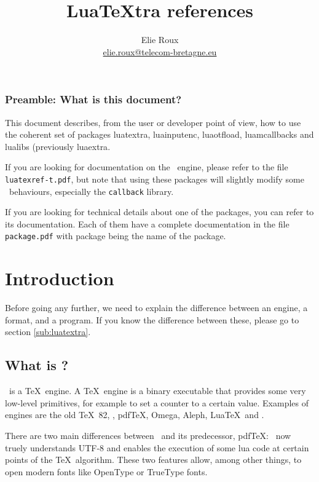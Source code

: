\documentclass{article}
\title{Lua\TeX tra references}
\author{Elie Roux \\ \url{elie.roux@telecom-bretagne.eu}}
\makeatletter
\newlength\xxt@kern@Te
\newlength\xxt@kern@eX
\newlength\xxt@lower@e
\DeclareRobustCommand\XeTeX{%
  \leavevmode
  \smash{%
   X\lower\xxt@lower@e
   \hbox{\kern\xxt@kern@eX
   \setbox0=\hbox{E}\dimen0=\ht0\advance\dimen0by\dp0%
   \raise\dimen0\hbox{\rotatebox{180}{\box0}}%
   }\kern\xxt@kern@Te\TeX}}%
\makeatother
\begin{document}
\maketitle

\subsubsection*{Preamble: What is this document?}

This document describes, from the user or developer point of view, how to use
the coherent set of packages \textsf{luatextra}, \textsf{luainputenc},
\textsf{luaotfload}, \textsf{luamcallbacks} and \textsf{lualibs} (previously
\textsf{luaextra}.

If you are looking for documentation on the \LuaTeX\ engine, please refer to
the file \texttt{luatexref-t.pdf}, but note that using these packages will
slightly modify some \LuaTeX\ behaviours, especially the \texttt{callback}
library.

If you are looking for technical details about one of the packages, you can
refer to its documentation. Each of them have a complete documentation in the
file \texttt{package.pdf} with package being the name of the package.

\tableofcontents

\section{Introduction}

Before going any further, we need to explain the difference between an engine,
a format, and a program. If you know the difference between these, please go
to section \ref{sub:luatextra}.

\subsection{What is \LuaTeX ?}

\LuaTeX\ is a \TeX\ engine. A \TeX\ engine is a binary executable that
provides some very low-level primitives, for example \texttt{\string\count} to
set a counter to a certain value. Examples of engines are the old \TeX\ 82,
\eTeX, pdf\TeX, Omega, Aleph, Lua\TeX\ and \XeTeX . 

There are two main differences between \LuaTeX\ and its predecessor, pdfTeX:
\LuaTeX\ now truely understands UTF-8 and enables the execution of some lua
code at certain points of the \TeX\ algorithm. These two features allow, among
other things, to open modern fonts like OpenType or TrueType fonts.
\end{document}
